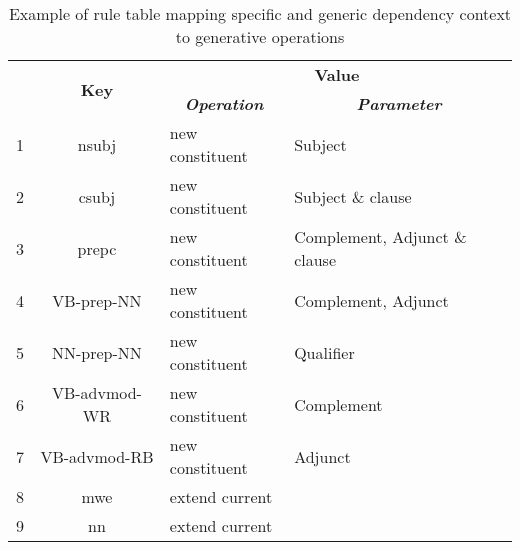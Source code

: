 \begin{table}[!ht]
	\centering
	\begin{tabular}{|l|c|l|l|}
		\hline
		\multirow{2}{*}{} & \multirow{2}{*}{\textbf{Key}} & \multicolumn{2}{c|}{\textbf{Value}}                                                                 \\ \cline{3-4} 
		&                               & \multicolumn{1}{c|}{\textit{\textbf{Operation}}} & \multicolumn{1}{c|}{\textit{\textbf{Parameter}}} \\ \hline
		1                 & nsubj                         & new constituent                                 & Subject                                          \\ \hline
		2                 & csubj                         & new constituent                         & Subject \& clause                                          \\ \hline
		3                 & prepc                         & new constituent                         & Complement, Adjunct \& clause                             \\ \hline
		4                 & VB-prep-NN                    & new constituent                                 & Complement, Adjunct                              \\ \hline
		5                 & NN-prep-NN                    & new constituent                                 & Qualifier                                        \\ \hline
		6                 & VB-advmod-WR                  & new constituent                                 & Complement                                       \\ \hline
		7                 & VB-advmod-RB                  & new constituent                                 & Adjunct                                          \\ \hline
		8                 & mwe                           & extend current                                  &                                                  \\ \hline
		9                 & nn                            & extend current                                  &                                                  \\ \hline
	\end{tabular}
	\caption{Example of rule table mapping specific and generic dependency context to generative operations}
	\label{tab:rule-table}
\end{table}

